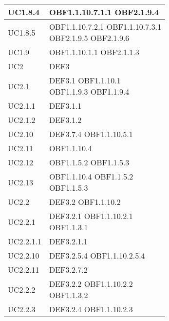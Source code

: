 \documentclass{scalatekids-article}
\begin{document}
\begin{longtable}[H]{|p{5.5cm}|p{5.5cm}|}
\hline
UC1.8.4 & \multiLineCell[t]{OBF1.1.10.7.1.1 OBF2.1.9.4\\}\\
\hline
UC1.8.5 & \multiLineCell[t]{OBF1.1.10.7.2.1 OBF1.1.10.7.3.1\\OBF2.1.9.5 OBF2.1.9.6\\}\\
\hline
UC1.9 & \multiLineCell[t]{OBF1.1.10.1.1 OBF2.1.1.3\\}\\
\hline
UC2 & \multiLineCell[t]{DEF3\\}\\
\hline
UC2.1 & \multiLineCell[t]{DEF3.1 OBF1.1.10.1\\OBF1.1.9.3 OBF1.1.9.4\\}\\
\hline
UC2.1.1 & \multiLineCell[t]{DEF3.1.1\\}\\
\hline
UC2.1.2 & \multiLineCell[t]{DEF3.1.2\\}\\
\hline
UC2.10 & \multiLineCell[t]{DEF3.7.4 OBF1.1.10.5.1\\}\\
\hline
UC2.11 & \multiLineCell[t]{OBF1.1.10.4\\}\\
\hline
UC2.12 & \multiLineCell[t]{OBF1.1.5.2 OBF1.1.5.3\\}\\
\hline
UC2.13 & \multiLineCell[t]{OBF1.1.10.4 OBF1.1.5.2\\OBF1.1.5.3}\\
\hline
UC2.2 & \multiLineCell[t]{DEF3.2 OBF1.1.10.2\\}\\
\hline
UC2.2.1 & \multiLineCell[t]{DEF3.2.1 OBF1.1.10.2.1\\OBF1.1.3.1}\\
\hline
UC2.2.1.1 & \multiLineCell[t]{DEF3.2.1.1\\}\\
\hline
UC2.2.10 & \multiLineCell[t]{DEF3.2.5.4 OBF1.1.10.2.5.4\\}\\
\hline
UC2.2.11 & \multiLineCell[t]{DEF3.2.7.2\\}\\
\hline
UC2.2.2 & \multiLineCell[t]{DEF3.2.2 OBF1.1.10.2.2\\OBF1.1.3.2\\}\\
\hline
UC2.2.3 & \multiLineCell[t]{DEF3.2.4 OBF1.1.10.2.3\\}\\

\end{longtable}
\end{document}
